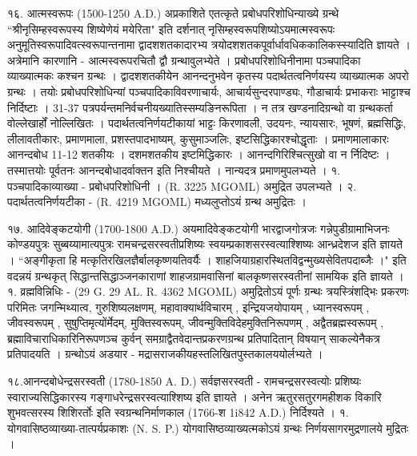 १६. आत्मस्वरूपः (1500-1250 A.D.)
अप्रकाशिते एतत्कृते प्रबोधपरिशोधिन्याख्ये ग्रन्थे ``श्रीनृसिम्हस्वरूपस्य शिष्येणेयं मयेरिता" इति दर्शनात् नृसिम्हस्वरूपशिष्योऽयमात्मस्वरूपः अनुमूतिस्वरूपादिवत्स्वरूपान्तनामा द्वादशशतकादारभ्य त्रयोदशशतकपूर्वार्धावधिककालिकस्स्यादिति ज्ञायते । अत्रेमानि कारणानि -
आत्मस्वरूपरचितौ द्वौ ग्रन्थावुलभ्येते । प्रबोधपरिशोधिनीनामा पञ्चपादिका व्याख्यात्मकः कश्चन ग्रन्थः । द्वादशशतकीयेन आनन्दनुभवेन कृतस्य पदार्थतत्वनिर्णयस्य व्याख्यात्मक अपरो ग्रन्थः । तयोः प्रबोधपरिशोधिन्यां पञ्चपादिकाविवरणाचार्यः, आचार्यसुन्दरपाण्ड्यः, गौडाचार्यः प्रभाकराः भाट्टाश्च निर्दिष्टाः । 31-37 पत्रपर्यन्तमनिर्वचनीयख्यातिस्सम्यङिनरूपिता । न तत्र खण्डनादिग्रन्थो वा ग्रन्थकर्ता वोल्लेखार्हों नोल्लिखितः । पदार्थतत्वनिर्णयटीकायां भाट्टः किरणावली, उदयनः, न्यायसारः, भूषणं, ब्रह्मसिद्धिः, लीलावतीकारः, प्रमाणमाला, प्रशस्तपादभाष्यम्, कुसुमाञ्जलिः, इष्टसिद्धिकारश्चोद्धृताः । प्रमाणमालाकारः आनन्दबोध 11-12 शतकीयः । दशमशतकीय इष्टमिद्धिकारः । आनन्दगिरिश्चित्सुखो वा न र्निदिष्टः । तस्मात्तयोः पूर्वतनः आनन्दबोधादर्वाक्तन इति निश्चीयते । नान्यदत्र प्रमाणमुपलभ्यते ।
१. पञ्चपादिकाव्याख्या - प्रबोधपरिशोधिनी । (R. 3225 MGOML) अमुद्रित उपलभ्यते ।
२. पदार्थतत्वनिर्णयटीका - (R. 4219 MGOML) मध्यलुप्तोऽयं ग्रन्थ अमुद्रितः ।

१७. आदिवेङ्कटयोगी (1700-1800 A.D.)
अयमादिवेङ्कटयोगी भारद्वाजगोत्रजः गन्नेपुडीग्रामाभिजनः कोण्डयपुत्रः सुब्बय्यामात्यपुत्रः रामचन्द्रसरस्वतीप्रशिष्यः स्वयम्प्रकाशसरस्वत्याश्शिष्यः आन्ध्रदेशज इति ज्ञायते । ``अङ्गीकृता हि मत्कृतिरखिलज्ञैर्बालकृष्णयतिवर्यैः । शाहजियाग्रहारस्थितविद्वन्मुख्यसेवितपदाब्जैः ।" इति वदन्नयं ग्रन्थकृत् सिद्धान्तसिद्धाञ्जनकाराणां शाहजग्रामवासिनां बालकृष्णसरस्वतीनां सामयिक इति ज्ञायते ।
१. व्रह्मविन्निधिः - (29 G. 29 AL. R. 4362 MGOML)
अमुद्रितोऽयं पूर्णः ग्रन्थः त्रयस्त्रिंशद्भिः प्रकरणः परिमितः जगन्मिथ्यात्व, गुरुशिष्यलक्षणम्, महावाक्यार्थविचारम् , इन्द्रियजयोपायम् , ध्यानस्वरूपम् , जीवस्वरूपम् ,  सुषुप्तिमृत्योंर्मेदम्, मुक्तिस्वरूपम्, जीवन्मुक्तिविदेहमुक्तिनिरूपणम् , अद्वैतब्रह्मस्वरूपम् , ब्रह्माविचाराधिकारिनिरूपणञ्च कुर्वन् समग्राद्वैतवेदान्तप्रकरणग्रन्थ प्रतिपादितान् विषयान् साकल्येनैकत्र प्रतिपादयति । ग्रन्थोऽयं अडयार - मद्रासराजकीयहस्तलिखितपुस्तकालययोर्लभ्यते ।

१८.आनन्दबोधेन्द्रसरस्वती (1780-1850 A. D.)
सर्वज्ञसरस्वती - रामचन्द्रसरस्वत्योः प्रशिष्यः स्वाराज्यसिद्धिकारस्य गङ्गाधरेन्द्रसरस्वत्याश्शिष्य इति ज्ञायते । अनेन ऋतुरसतुरगमहीशक विकारि शुभवत्सरस्य शिशिरर्तोः इति स्वग्रन्थनिर्माणकाल (1766-श 1i842 A.D.) निर्दिश्यते ।
१. योगवासिष्ठव्याख्या-तात्पर्यप्रकाशः (N. S. P.) योगवासिष्ठव्याख्यत्मकोऽयं ग्रन्थः निर्णयसागरमुद्रणालये मुद्रितः ।

